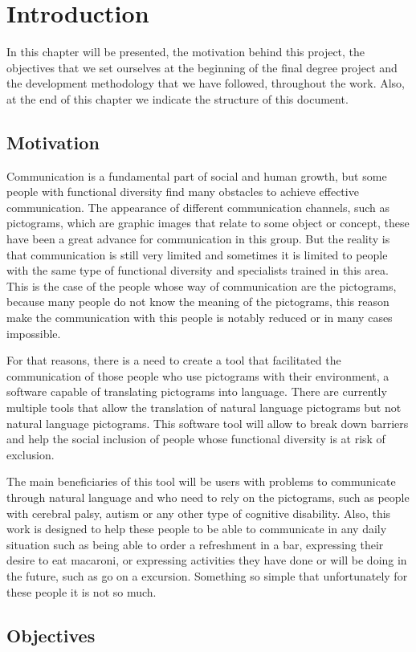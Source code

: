 
\chapter{Introduction}
\label{cap:introduction}
 
In this chapter will be presented, the motivation behind this project, the objectives that we set ourselves at the beginning of the final degree project and the development methodology that we have followed, throughout the work. Also, at the end of this chapter we indicate the structure of this document.

\section{Motivation}

Communication is a fundamental part of social and human growth, but some people with functional diversity find many obstacles to achieve effective communication. The appearance of different communication channels, such as pictograms, which are graphic images that relate to some object or concept, these have been a great advance for communication in this group. But the reality is that communication is still very limited and sometimes it is limited to people with the same type of functional diversity and specialists trained in this area. This is the case of the people whose way of communication are the pictograms, because many people do not know the meaning of the pictograms, this reason make the communication with this people is notably reduced or in many cases impossible. 

For that reasons, there is a need to create a tool that facilitated the communication of those people who use pictograms with their environment, a software capable of translating pictograms into language. There are currently multiple tools that allow the translation of natural language pictograms but not natural language pictograms. This software tool will allow to break down barriers and help the social inclusion of people whose functional diversity is at risk of exclusion.


The main beneficiaries of this tool will be users with problems to communicate through natural language and who need to rely on the pictograms, such as people with cerebral palsy, autism or any other type of cognitive disability.
Also, this work is designed to help these people to be able to communicate in any daily situation such as being able to order a refreshment in a bar, expressing their desire to eat macaroni, or expressing activities they have done or will be doing in the future, such as go on a excursion. Something so simple that unfortunately for these people it is not so much.

\section{Objectives}
